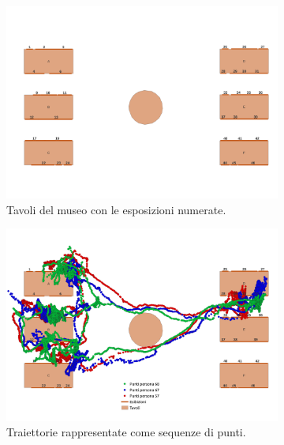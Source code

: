 \documentclass[12pt]{article}
\begin{document}
\begin{figure}[htb!]
    \centering
    \begin{subfigure}[b]{0.4\textwidth}
        \centering
        \includegraphics[width=\textwidth]{images/tables_with_exhibits.png}
        \caption{Tavoli del museo con le esposizioni numerate.}
        \label{tables_with_exhibits}
    \end{subfigure}
    \hfill
    \begin{subfigure}[b]{0.4\textwidth}
        \centering
        \includegraphics[width=\textwidth]{images/tables_with_exhibits_and_trajectories.png}
        \caption{Traiettorie rappresentate come sequenze di punti.}
        \label{tables_with_exhibits_and_trajectories}
    \end{subfigure}
    \hfill
    \caption{}
\end{figure}
\end{document}
